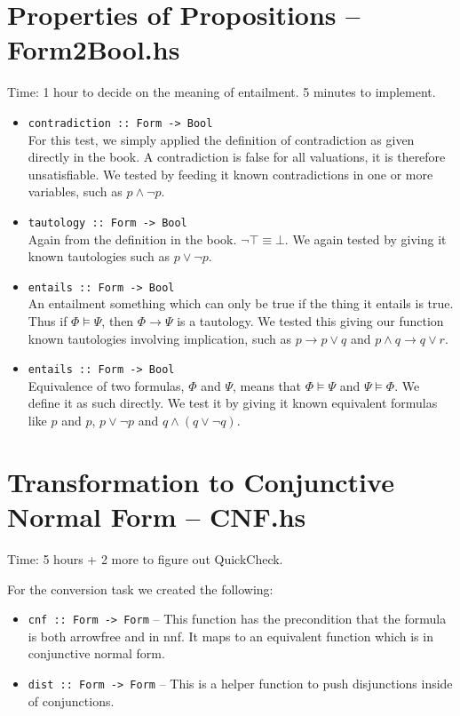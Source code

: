 \documentclass[11pt,a4paper]{article}
\numberwithin{equation}{section}%
\begin{document}
\section{Properties of Propositions \--- Form2Bool.hs}
Time: 1 hour to decide on the meaning of entailment. 5 minutes to implement.
\begin{itemize}
    \item \texttt{contradiction :: Form -> Bool} \\
        For this test, we simply applied the definition of contradiction as given directly in the book. A contradiction is false for all valuations, it is therefore unsatisfiable. We tested by feeding it known contradictions in one or more variables, such as $p \wedge \neg p$.
    \item \texttt{tautology :: Form -> Bool} \\
        Again from the definition in the book. $\neg \top \equiv \bot$. We again tested by giving it known tautologies such as $p \vee \neg p$.
    \item \texttt{entails :: Form -> Bool} \\
        An entailment something which can only be true if the thing it entails is true. Thus if $\Phi \models \Psi$, then $\Phi \rightarrow \Psi$ is a tautology. We tested this giving our function known tautologies involving implication, such as $p \rightarrow p \vee q$ and $p \wedge q \rightarrow q \vee r$.
    \item \texttt{entails :: Form -> Bool} \\ 
        Equivalence of two formulas, $\Phi$ and $\Psi$, means that $\Phi \models \Psi$ and $\Psi \models \Phi$. We define it as such directly. We test it by giving it known equivalent formulas like $p$ and $p$, $p \vee \neg p$ and $q \wedge (q \vee \neg q)$.
\end{itemize}


\section{Transformation to Conjunctive Normal Form \--- CNF.hs}
Time: 5 hours + 2 more to figure out QuickCheck.

For the conversion task we created the following:
\begin{itemize}
    \item \texttt{cnf :: Form -> Form} \---
        This function has the precondition that the formula is both arrowfree and in nnf. It maps to an equivalent function which is in conjunctive normal form.
    \item \texttt{dist :: Form -> Form} \---
        This is a helper function to push disjunctions inside of conjunctions.
\end{itemize}
\end{document}
